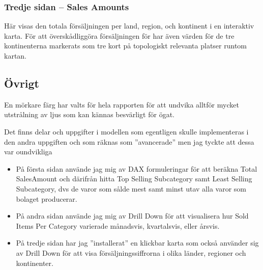 \documentclass[10pt]{article}
\begin{document}
\subsubsection{Tredje sidan -- Sales Amounts}

Här visas den totala försäljningen per land, region, och kontinent i en interaktiv karta. För att överskådliggöra försäljningen för har även värden för de tre kontinenterna markerats som tre kort på topologiskt relevanta platser runtom kartan.

\subsection{Övrigt}

En mörkare färg har valts för hela rapporten för att undvika alltför mycket utstrålning av ljus som kan kännas besvärligt för ögat.

Det finns delar och uppgifter i modellen som egentligen skulle implementeras i den andra uppgiften och som räknas som ''avancerade'' men jag tyckte att dessa var oundvikliga

\begin{itemize}
	\item På första sidan använde jag mig av DAX formuleringar för att beräkna Total SalesAmount och därifrån hitta Top Selling Subcategory samt Least Selling Subcategory, dvs de varor som sålde mest samt minst utav alla varor som bolaget producerar.
	\item På andra sidan använde jag mig av Drill Down för att visualisera hur Sold Items Per Category varierade månadsvis, kvartalsvis, eller årsvis.
	\item På tredje sidan har jag ''installerat'' en klickbar karta som också använder sig av Drill Down för att visa försäljningssiffrorna i olika länder, regioner och kontinenter.
\end{itemize}
\end{document}
